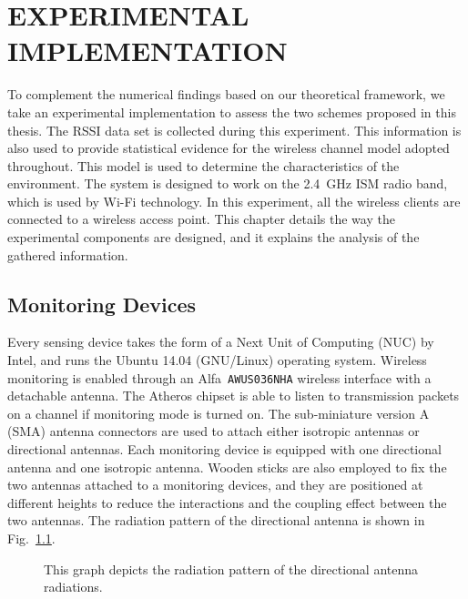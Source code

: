 \chapter{EXPERIMENTAL IMPLEMENTATION}

To complement the numerical findings based on our theoretical framework, we take an experimental implementation to assess the two schemes proposed in this thesis.
The RSSI data set is collected during this experiment.
This information is also used to provide statistical evidence for the wireless channel model adopted
throughout. This model is used to determine the characteristics of the environment.
The system is designed to work on the 2.4~GHz ISM radio band, which is used by Wi-Fi technology.
In this experiment, all the wireless clients are connected to a wireless access point.
This chapter details the way the experimental components are designed, and it explains the analysis of the gathered information.


\section{Monitoring Devices}

Every sensing device takes the form of a Next Unit of Computing (NUC) by Intel{\texttrademark}, and runs the Ubuntu 14.04 (GNU/Linux) operating system.
Wireless monitoring is enabled through an Alfa{\texttrademark}~\texttt{AWUS036NHA} wireless interface with a detachable antenna.
The Atheros{\texttrademark} chipset is able to listen to transmission packets on a channel if monitoring mode is turned on.
The sub-miniature version A (SMA) antenna connectors are used to attach either isotropic antennas or directional antennas.
Each monitoring device is equipped with one directional antenna and one isotropic antenna.
Wooden sticks are also employed to fix the two antennas attached to a monitoring devices, and they are positioned at different heights to reduce the interactions and the coupling effect between the two antennas.
The radiation pattern of the directional antenna is shown in Fig.~\ref{figure:Directionalantenna}.
\begin{figure}[t]
	\centerline{}
	\caption{This graph depicts the radiation pattern of the directional antenna radiations.}
	\label{figure:Directionalantenna}
\end{figure}

